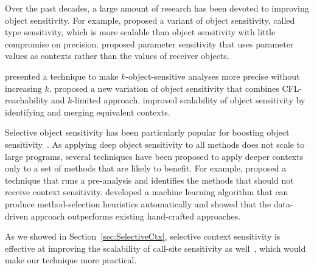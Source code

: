 Over the past decades, a large amount of  research
 has been devoted to improving object sensitivity.
For example, \citet{Smaragdakis2011} proposed a variant of object sensitivity, called type sensitivity, which is more scalable than object sensitivity with little compromise on precision.
\citet{SridharanDCST12} proposed parameter sensitivity that uses parameter values as contexts rather than the values of receiver objects.
\begin{comment}
Kastrinis and Smaragdakis \cite{KastrinisS13a} observed weaknesses of object sensitivity in static calls and developed a hybrid method that combines object sensitivity and call-site sensitivity.
\end{comment}
\citet{TanLX16} presented a technique to make $k$-object-sensitive analyses more precise 
without increasing $k$.
\citet{Thiessen2017} proposed a new variation of object sensitivity
that combines CFL-reachability and $k$-limited approach. 
\citet{Xu2008} improved scalability of object sensitivity by identifying and merging equivalent contexts.


Selective object sensitivity has been particularly popular for boosting object 
sensitivity~\cite{Smaragdakis2014,Li2018a,Li2018b,JeJeChOh17,WeiR15,Liang2011,Liang2011learning,Lu:2019:PYF}.  As 
applying deep object sensitivity to
all methods does not scale to large programs, several techniques have
been proposed to apply deeper contexts only to a set of methods
that are likely to benefit.
For example, \citet{Smaragdakis2014} proposed a technique that runs a
pre-analysis and identifies the methods that should not receive
context sensitivity. \citet{JeJeChOh17} developed a machine learning
algorithm that can produce method-selection heuristics automatically
and showed that the data-driven approach outperforms existing
hand-crafted approaches. 
\begin{comment}
Li et al.~\cite{Li2018a} identified representative
cases that require object sensitivity and proposed a technique to
accurately apply object sensitivity to those cases only.
\end{comment}
As we showed in Section~\ref{sec:SelectiveCtx}, selective context sensitivity is
effective at improving the scalability of call-site sensitivity as
well~\cite{Smaragdakis2014,Oh2014,ZipperJournal20}, which would make our 
technique more practical. 







